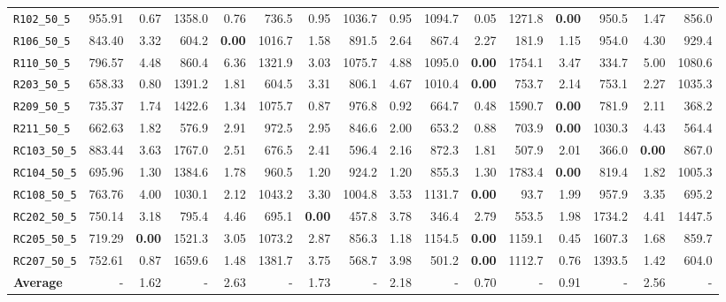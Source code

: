 \begin{table}[ht]
\begin{adjustbox}{width=\textwidth}
\begin{tabular}{l r r r @{\hspace{8pt}} r r @{\hspace{8pt}} r r @{\hspace{8pt}} r r @{\hspace{8pt}} r r @{\hspace{8pt}} r r @{\hspace{8pt}} r r @{\hspace{8pt}}}
\texttt{R102\_50\_5} & 955.91 & 0.67 & 1358.0 & 0.76 & 736.5 & 0.95 & 1036.7 & 0.95 & 1094.7 & 0.05 & 1271.8 & \textbf{0.00} & 950.5 & 1.47 & 856.0 \\
\texttt{R106\_50\_5} & 843.40 & 3.32 & 604.2 & \textbf{0.00} & 1016.7 & 1.58 & 891.5 & 2.64 & 867.4 & 2.27 & 181.9 & 1.15 & 954.0 & 4.30 & 929.4 \\
\texttt{R110\_50\_5} & 796.57 & 4.48 & 860.4 & 6.36 & 1321.9 & 3.03 & 1075.7 & 4.88 & 1095.0 & \textbf{0.00} & 1754.1 & 3.47 & 334.7 & 5.00 & 1080.6 \\
\texttt{R203\_50\_5} & 658.33 & 0.80 & 1391.2 & 1.81 & 604.5 & 3.31 & 806.1 & 4.67 & 1010.4 & \textbf{0.00} & 753.7 & 2.14 & 753.1 & 2.27 & 1035.3 \\
\texttt{R209\_50\_5} & 735.37 & 1.74 & 1422.6 & 1.34 & 1075.7 & 0.87 & 976.8 & 0.92 & 664.7 & 0.48 & 1590.7 & \textbf{0.00} & 781.9 & 2.11 & 368.2 \\
\texttt{R211\_50\_5} & 662.63 & 1.82 & 576.9 & 2.91 & 972.5 & 2.95 & 846.6 & 2.00 & 653.2 & 0.88 & 703.9 & \textbf{0.00} & 1030.3 & 4.43 & 564.4 \\
\texttt{RC103\_50\_5} & 883.44 & 3.63 & 1767.0 & 2.51 & 676.5 & 2.41 & 596.4 & 2.16 & 872.3 & 1.81 & 507.9 & 2.01 & 366.0 & \textbf{0.00} & 867.0 \\
\texttt{RC104\_50\_5} & 695.96 & 1.30 & 1384.6 & 1.78 & 960.5 & 1.20 & 924.2 & 1.20 & 855.3 & 1.30 & 1783.4 & \textbf{0.00} & 819.4 & 1.82 & 1005.3 \\
\texttt{RC108\_50\_5} & 763.76 & 4.00 & 1030.1 & 2.12 & 1043.2 & 3.30 & 1004.8 & 3.53 & 1131.7 & \textbf{0.00} & 93.7 & 1.99 & 957.9 & 3.35 & 695.2 \\
\texttt{RC202\_50\_5} & 750.14 & 3.18 & 795.4 & 4.46 & 695.1 & \textbf{0.00} & 457.8 & 3.78 & 346.4 & 2.79 & 553.5 & 1.98 & 1734.2 & 4.41 & 1447.5 \\
\texttt{RC205\_50\_5} & 719.29 & \textbf{0.00} & 1521.3 & 3.05 & 1073.2 & 2.87 & 856.3 & 1.18 & 1154.5 & \textbf{0.00} & 1159.1 & 0.45 & 1607.3 & 1.68 & 859.7 \\
\texttt{RC207\_50\_5} & 752.61 & 0.87 & 1659.6 & 1.48 & 1381.7 & 3.75 & 568.7 & 3.98 & 501.2 & \textbf{0.00} & 1112.7 & 0.76 & 1393.5 & 1.42 & 604.0 \\
\midrule
\textbf{Average} & - & 1.62 & - & 2.63 & - & 1.73 & - & 2.18 & - & 0.70 & - & 0.91 & - & 2.56 & - \\
\bottomrule
\end{tabular}
\end{adjustbox}
\end{table}